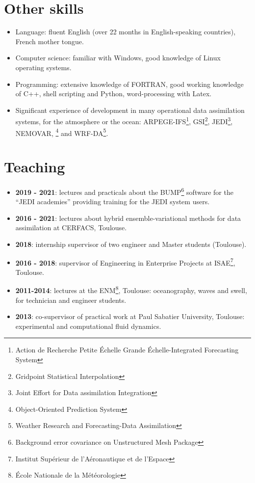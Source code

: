 \documentclass[a4paper,9pt]{scrreprt}
\begin{document}
\section*{Other skills}
\begin{itemize}
\item Language: fluent English (over 22 months in English-speaking countries), French mother tongue.\vspace{-0.1cm}
\item Computer science: familiar with Windows, good knowledge of Linux operating systems.\vspace{-0.1cm}
\item Programming: extensive knowledge of FORTRAN, good working knowledge of C++, shell scripting and Python, word-processing with Latex.\vspace{-0.1cm}
\item Significant experience of development in many operational data assimilation systems, for the atmosphere or the ocean: ARPEGE-IFS\footnote{Action de Recherche Petite {\'E}chelle Grande {\'E}chelle-Integrated Forecasting System}, GSI\footnote{Gridpoint Statistical Interpolation}, JEDI\footnote{Joint Effort for Data assimilation Integration}, NEMOVAR, \footnote{Object-Oriented Prediction System} and WRF-DA\footnote{Weather Research and Forecasting-Data Assimilation}.
\end{itemize}

\section*{Teaching}
\begin{itemize}
\item \textbf{2019 - 2021}: lectures and practicals about the BUMP\footnote{Background error covariance on Unstructured Mesh Package} software for the ``JEDI academies'' providing training for the JEDI system users.\vspace{-0.1cm}
\item \textbf{2016 - 2021}: lectures about hybrid ensemble-variational methods for data assimilation at CERFACS, Toulouse.\vspace{-0.1cm}
\item \textbf{2018}: internship supervisor of two engineer and Master students (Toulouse).\vspace{-0.1cm}
\item \textbf{2016 - 2018}: supervisor of Engineering in Enterprise Projects at ISAE\footnote{Institut Supérieur de l'Aéronautique et de l'Espace}, Toulouse.\vspace{-0.1cm}
\item \textbf{2011-2014}: lectures at the ENM\footnote{{\'E}cole Nationale de la Météorologie}, Toulouse: oceanography, waves and swell, for technician and engineer students.\vspace{-0.1cm}
\item \textbf{2013}: co-supervisor of practical work at Paul Sabatier University, Toulouse: experimental and computational fluid dynamics.
\end{itemize}
\end{document}
